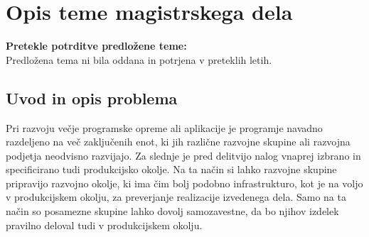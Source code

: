 \documentclass[a4paper, 12pt]{article}
\newcommand\cmnt[1]{\textcolor{munsell}{#1}}
\begin{document}
\section{Opis teme magistrskega dela}


\textbf{Pretekle potrditve predložene teme:}\\
Predložena tema ni bila oddana in potrjena v preteklih letih.

\subsection{Uvod in opis problema}

Pri razvoju večje programske opreme ali aplikacije je programje navadno razdeljeno na več zaključenih enot, ki jih različne razvojne skupine ali razvojna podjetja neodvisno razvijajo. Za slednje je pred delitvijo nalog vnaprej izbrano in specificirano tudi produkcijsko okolje. Na ta način si lahko razvojne skupine pripravijo razvojno okolje, ki ima čim bolj podobno infrastrukturo, kot je na voljo v produkcijskem okolju, za preverjanje realizacije izvedenega dela. Samo na ta način so posamezne skupine lahko dovolj samozavestne, da bo njihov izdelek pravilno deloval tudi v produkcijskem okolju.
\end{document}
